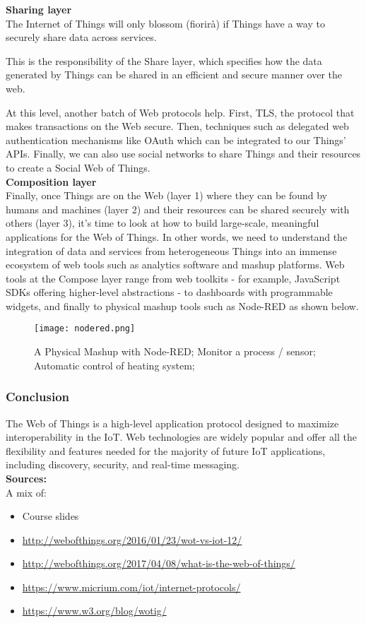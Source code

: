 \textbf{Sharing layer}\\

The Internet of Things will only blossom (fiorirà) if Things have a way to
securely share data across services.

This is the responsibility of the Share layer, which specifies how the data
generated by Things can be shared in an efficient and secure manner over
the web.

At this level, another batch of Web protocols help.
First, TLS, the protocol that makes transactions on the Web secure.
Then, techniques such as delegated web authentication mechanisms like OAuth
which can be integrated to our Things' APIs. Finally, we can also use social
networks to share Things and their resources to create a Social Web of Things.\\

\textbf{Composition layer}\\

Finally, once Things are on the Web (layer 1) where they can be found by humans
and machines (layer 2) and their resources can be shared securely with others
(layer 3), it's time to look at how to build large-scale, meaningful
applications for the Web of Things. In other words, we need to understand the
integration of data and services from heterogeneous Things into an immense
ecosystem of web tools such as analytics software and mashup platforms.
Web tools at the Compose layer range from web toolkits - for example, JavaScript
SDKs offering higher-level abstractions - to dashboards with programmable
widgets, and finally to physical mashup tools such as Node-RED as shown below.

\begin{figure}[H]
  \centering
  \texttt{[image: nodered.png]}
  \caption{A Physical Mashup with Node-RED;
Monitor a process / sensor;
Automatic control of heating system;}
  \label{fig:nodered}
\end{figure}

\subsubsection{Conclusion}

The Web of Things is a high-level application protocol designed to maximize
interoperability in the IoT. Web technologies are widely popular and offer all
the flexibility and features needed for the majority of future IoT applications,
including discovery, security, and real-time messaging.\\

\textbf{Sources:}\\

A mix of:

\begin{itemize}
\item Course slides
\item \url{http://webofthings.org/2016/01/23/wot-vs-iot-12/}
\item \url{http://webofthings.org/2017/04/08/what-is-the-web-of-things/}
\item \url{https://www.micrium.com/iot/internet-protocols/}
\item \url{https://www.w3.org/blog/wotig/}
\end{itemize}
